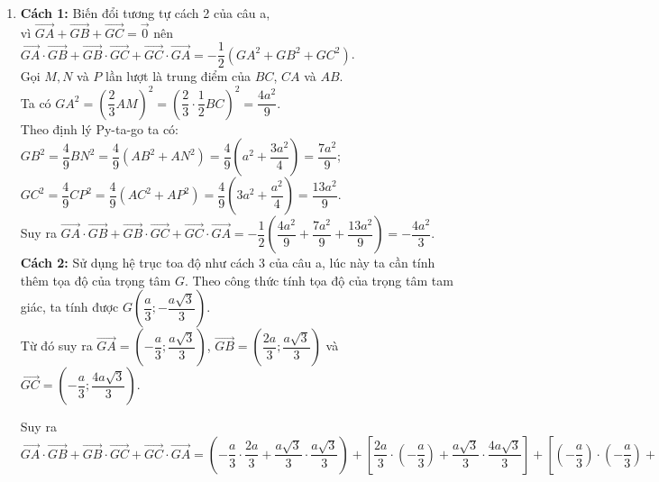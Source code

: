 \begin{vd}
{\begin{enumerate}
			      $ \overrightarrow{CA}\cdot \overrightarrow{AB}=0 $.\\
			      Vậy $ \overrightarrow{AB}\cdot \overrightarrow{BC} + \overrightarrow{BC}\cdot \overrightarrow{CA} + \overrightarrow{CA}\cdot \overrightarrow{AB}=-a^2-3a^2=-4a^2 $.
			\item \textbf{Cách 1:} Biến đổi tương tự cách 2 của câu a,\\
			      vì $ \overrightarrow{GA}+\overrightarrow{GB}+\overrightarrow{GC}=\overrightarrow{0} $ nên $ \overrightarrow{GA}\cdot \overrightarrow{GB} + \overrightarrow{GB}\cdot \overrightarrow{GC} + \overrightarrow{GC}\cdot \overrightarrow{GA}=-\dfrac{1}{2}\left(GA^2+GB^2+GC ^2 \right) $.\\
			      Gọi $ M, N $ và $ P $ lần lượt là trung điểm của $ BC $, $ CA $ và $ AB $.\\
			      Ta có $ GA^2=\left( \dfrac{2}{3}AM \right)^2=\left( \dfrac{2}{3}\cdot \dfrac{1}{2}BC \right)^2=\dfrac{4a^2}{9}  $.\\
			      Theo định lý Py-ta-go ta có:\\
			      $ GB^2=\dfrac{4}{9}BN^2=\dfrac{4}{9}\left( AB^2+AN^2 \right)=\dfrac{4}{9}\left (a^2+\dfrac{3a^2}{4}\right )=\dfrac{7a^2}{9}  $;\\
			      $ GC^2=\dfrac{4}{9}CP^2=\dfrac{4}{9}\left( AC^2+AP^2 \right)=\dfrac{4}{9}\left (3a^2+\dfrac{a^2}{4}\right )=\dfrac{13a^2}{9} $.\\
			      Suy ra $ \overrightarrow{GA}\cdot \overrightarrow{GB} + \overrightarrow{GB}\cdot \overrightarrow{GC} + \overrightarrow{GC}\cdot \overrightarrow{GA}=-\dfrac{1}{2}\left (\dfrac{4a^2}{9}+\dfrac{7a^2}{9}+\dfrac{13a^2}{9}\right )=-\dfrac{4a^2}{3} $.\\
			      \textbf{Cách 2:} Sử dụng hệ trục toa độ như cách 3 của câu a, lúc này ta cần tính thêm tọa độ của trọng tâm $ G $. Theo công thức tính tọa độ của trọng tâm tam giác, ta tính được $ G\left (\dfrac{a}{3};-\dfrac{a\sqrt{3}}{3}\right ) $.\\
			      Từ đó suy ra $ \overrightarrow{GA}=\left (-\dfrac{a}{3};\dfrac{a\sqrt{3}}{3}\right ) $, $ \overrightarrow{GB}=\left (\dfrac{2a}{3};\dfrac{a\sqrt{3}}{3}\right ) $ và $ \overrightarrow{GC}=\left (-\dfrac{a}{3};\dfrac{4a\sqrt{3}}{3}\right ) $.
			      \begin{flushleft}
				      Suy ra $ \overrightarrow{GA}\cdot \overrightarrow{GB} + \overrightarrow{GB}\cdot \overrightarrow{GC} + \overrightarrow{GC}\cdot \overrightarrow{GA}=\left (-\dfrac{a}{3}\cdot \dfrac{2a}{3}+\dfrac{a\sqrt{3}}{3}\cdot \dfrac{a\sqrt{3}}{3}\right )+\left [\dfrac{2a}{3}\cdot \left( -\dfrac{a}{3} \right) + \dfrac{a\sqrt{3}}{3}\cdot \dfrac{4a\sqrt{3}}{3}\right ]+ \left [\left( -\dfrac{a}{3} \right) \cdot \left(-\dfrac{a}{3} \right) +\dfrac{4a\sqrt{3}}{3}\cdot \dfrac{a\sqrt{3}}{3}\right ]=-\dfrac{4a^2}{3}. $
			      \end{flushleft}
		\end{enumerate}
	}
\end{vd}

